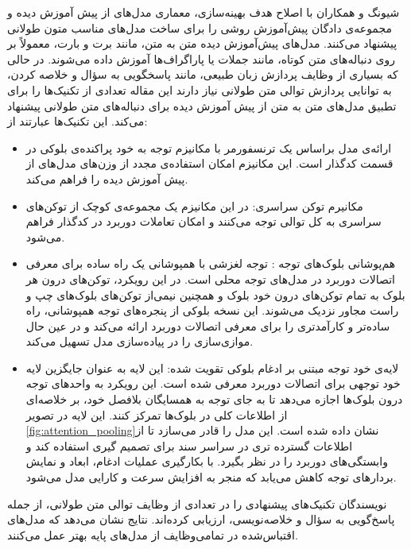 شیونگ و همکاران با اصلاح هدف بهینه‌سازی، معماری مدل‌‌های از پیش آموزش دیده و مجموعه‌ی دادگان پیش‌آموزش
روشی را برای ساخت مدل‌های مناسب متون طولانی پیشنهاد می‌کنند. مدل‌های پيش‌آموزش دیده متن به متن، مانند برت و بارت، معمولاً بر روی دنباله‌های متن کوتاه، مانند جملات یا پاراگراف‌ها آموزش داده می‌شوند. در حالی که بسیاری از وظایف پردازش زبان طبیعی، مانند پاسخگویی به سؤال و خلاصه کردن، به توانایی پردازش توالی متن طولانی نیاز دارند این مقاله تعدادی از تکنیک‌ها را برای تطبیق مدل‌های متن به متن از پیش آموزش دیده برای دنباله‌های متن طولانی پیشنهاد می‌کند. این تکنیک‌ها عبارتند از:
\begin{itemize}
	\item{
		ارائه‌ی مدل براساس یک ترنسفورمر با 	مکانیزم توجه به خود پراکنده‌ی بلوکی
		در قسمت کدگذار است. این مکانیزم امکان استفاده‌ی مجدد از وزن‌های مدل‌های از پیش آموزش دیده را فراهم می‌کند.	
	}
	
	\item {
		مکانیرم توکن سراسری:
		در این مکانیزم یک مجموعه‌ی کوچک از توکن‌های سراسری به کل توالی توجه می‌کنند و امکان تعاملات دوربرد در کدگذار فراهم می‌شود.
	}
	\item{
		هم‌پوشانی بلوک‌های توجه
		: توجه لغزشی با همپوشانی یک راه ساده برای معرفی اتصالات دوربرد در مدل‌های توجه محلی است. در این رویکرد، توکن‌های درون هر بلوک به تمام توکن‌های درون خود بلوک و همچنین نیمی‌از توکن‌های بلوک‌های چپ و راست مجاور نزدیک می‌شوند. این نسخه بلوکی از پنجره‌های توجه همپوشانی، راه ساده‌تر و کارآمدتری را برای معرفی اتصالات دوربرد ارائه می‌کند و در عین حال موازی‌سازی را در پیاده‌سازی مدل تسهیل می‌کند.
		
	}
	\item{
		لایه‌ی خود توجه مبتنی بر ادغام بلوکی تقویت شده:
		این لایه به عنوان جایگزین لایه خود توجهی برای اتصالات دوربرد معرفی شده است. این رویکرد به واحدهای توجه درون بلوک‌ها اجازه می‌دهد تا به جای توجه به همسایگان بلافصل خود، بر خلاصه‌ای از اطلاعات کلی در بلوک‌ها تمرکز کنند. این لایه در تصویر \ref{fig:attention_pooling}نشان داده شده است. این مدل را قادر می‌سازد تا از اطلاعات گسترده تری در سراسر سند برای تصمیم گیری استفاده کند و وابستگی‌های دوربرد را در نظر بگیرد. با بکارگیری عملیات ادغام، ابعاد و نمایش بردارهای توجه کاهش می‌یابد که منجر به افزایش سرعت و کارایی مدل می‌شود.}
\end{itemize}
نویسندگان تکنیک‌های پیشنهادی را در تعدادی از وظایف توالی متن طولانی، از جمله پاسخ‌گویی به سؤال و خلاصه‌نویسی، ارزیابی کرده‌اند. نتایج نشان می‌دهد که مدل‌های اقتباس‌شده در تمامی‌وظایف از مدل‌های پایه بهتر عمل می‌کنند.
